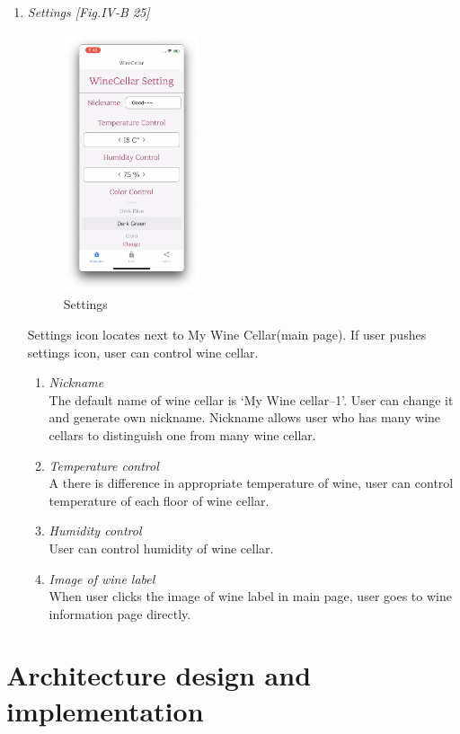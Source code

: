 \documentclass[conference]{IEEEtran}
\numberwithin{figure}{subsection}
\begin{document}
\begin{enumerate}
    \item \textit{Settings [Fig.IV-B 25]}\\
    \begin{figure}[htb!]
        \centerline{\includegraphics[width=4cm]{setting.png}}
        \caption{Settings}
    \end{figure}
    Settings icon locates next to My Wine Cellar(main page). If user pushes settings icon, user can control wine cellar.
    \begin{enumerate}
        \item \textit{Nickname}\\
        The default name of wine cellar is ‘My Wine cellar–1’. User can change it and generate own nickname. Nickname allows user who has many wine cellars to distinguish one from many wine cellar.\\
        \item \textit{Temperature control}\\
        A there is difference in appropriate temperature of wine, user can control temperature of each floor of wine cellar.
        \item \textit{Humidity control}\\
        User can control humidity of wine cellar.
        \item \textit{Image of wine label}\\
        When user clicks the image of wine label in main page, user goes to wine information page directly.
    \end{enumerate}
\end{enumerate}

\section{Architecture design and implementation}
\end{document}

